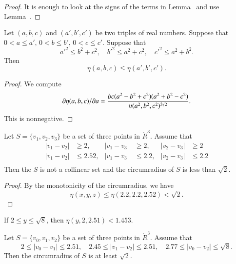 
\begin{proof} It is enough to look at the signs of the terms in
Lemma~ and use Lemma~.
\end{proof}

\newpage

\begin{lemma}
Let $(a,b,c)$ and $(a',b',c')$ be two triples of real numbers.
Suppose that $0 < a\le a'$, $0 < b\le b'$, $0< c\le c'$.  Suppose that
   $$
   a'^2 \le b^2 + c^2,\quad b'^2 \le a^2 + c^2,\quad c'^2\le a^2 + b^2.
   $$
Then
   $$
   \eta(a,b,c) \le \eta(a',b',c').
   $$
\end{lemma}


\begin{proof} We compute
	$$\partial\eta(a,b,c)/\partial a = 
        \frac{b c (a^2 - b^2 + c^2)(a^2 + b^2 - c^2)}{\ups(a^2,b^2,c^2)^{3/2}}.
	$$
This is nonnegative.  
\end{proof}

\newpage

\begin{lemma}
Let $S=\{v_1,v_2,v_3\}$ be a set of three points in $\ring{R}^3$.
Assume that
	$$
	\begin{array}{rlrlrl}
	|v_1-v_2|&\ge 2,  &|v_1-v_3|&\ge 2,   &|v_2-v_3|&\ge 2\\
	|v_1-v_2|&\le 2.52, &|v_1-v_3|&\le 2.2, &|v_2-v_3|&\le 2.2\\
	\end{array}
	$$
Then the $S$ is not a collinear set and the circumradius of 
$S$ is less than $\sqrt2$.
\end{lemma}

\begin{proof}
By the monotonicity of the circumradius, we have
	$$\eta(x,y,z)\le \eta(2.2,2.2,2.52) < \sqrt2.$$
\end{proof}

\begin{lemma}
If $2\le y\le\sqrt8$, then $\eta(y,2,2.51) < 1.453$.
\end{lemma}

\begin{lemma}
Let $S=\{v_0,v_1,v_2\}$ be a set of three points in $\ring{R}^3$.
Assume that 
  $$
  2\le|v_0-v_1|\le 2.51,\quad 2.45\le|v_1-v_2|\le 2.51,
  \quad 2.77\le |v_0-v_2|\le \sqrt8.
  $$
Then the circumradius of $S$ is at least $\sqrt2$.
\end{lemma}


